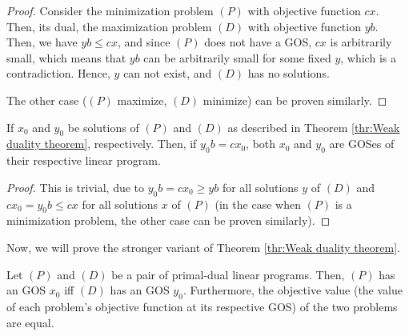 \begin{proof}
  Consider the minimization problem \( (P) \) with objective function \( cx \).
  Then, its dual, the maximization problem \( (D) \) with objective function \( yb \).
  Then, we have \( yb \le cx \), and since \( (P) \) does not have a GOS, \( cx
  \) is arbitrarily small, which means that \( yb \) can be arbitrarily small
  for some fixed \( y \), which is a contradiction. Hence, \( y \) can not
  exist, and \( (D) \) has no solutions.

  The other case (\( (P) \) maximize, \( (D) \) minimize) can be proven
  similarly.
\end{proof}

\begin{corollary}
\label{cor:Equality in primal-dual inequality}
  If \( x_{0} \) and \( y_{0} \) be solutions of \( (P) \) and \( (D) \) as
  described in Theorem \ref{thr:Weak duality theorem}, respectively. Then, if \(
  y_{0}b = cx_{0}\), both \( x_{0} \) and \( y_{0} \) are GOSes of their
  respective linear program.
\end{corollary}

\begin{proof}
  This is trivial, due to \( y_{0}b = cx_{0} \ge yb\) for all solutions \( y \)
  of \( (D) \) and \( cx_{0} = y_{0}b \le cx \) for all solutions \( x \) of \(
  (P)\) (in the case when \( (P) \) is a minimization problem, the other case
  can be proven similarly).
\end{proof}

Now, we will prove the stronger variant of Theorem \ref{thr:Weak duality
theorem}.

\begin{theorem}
\label{thr:Strong duality theorem}
  Let \( (P) \) and \( (D) \) be a pair of primal-dual linear programs.
  Then, \( (P) \) has an GOS \( x_{0} \) iff \( (D) \) has an GOS \( y_{0} \).
  Furthermore, the objective value (the value of each problem's objective
  function at its respective GOS) of the two problems are equal.
\end{theorem}


